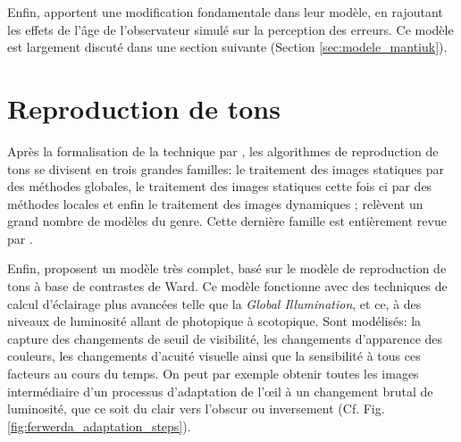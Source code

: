 	\par Enfin, \citep{mantiuk_human_2015} apportent une modification fondamentale dans leur modèle, en rajoutant les effets de l'âge de l'observateur simulé sur la perception des erreurs. Ce modèle est largement discuté dans une section suivante (Section \ref{sec:modele_mantiuk}).
	
	\section{Reproduction de tons}
	\par Après la formalisation de la technique par \citep{rushmeier_comparing_1995}, les algorithmes de reproduction de tons se divisent en trois grandes familles: le traitement des images statiques par des méthodes globales, le traitement des images statiques cette fois ci par des méthodes locales et enfin le traitement des images dynamiques ; \citep{moreau_traite_2006} relèvent un grand nombre de modèles du genre. Cette dernière famille est entièrement revue par \citep{drago_perceptual_2003}.
	
	\par Enfin, \citep{ferwerda_model_1996} proposent un modèle très complet, basé sur le modèle de reproduction de tons à base de contrastes de Ward. Ce modèle fonctionne avec des techniques de calcul d'éclairage plus avancées telle que la \textit{Global Illumination}, et ce, à des niveaux de luminosité allant de photopique à scotopique. Sont modélisés: la capture des changements de seuil de visibilité, les changements d'apparence des couleurs, les changements d'acuité visuelle ainsi que la sensibilité à tous ces facteurs au cours du temps. On peut par exemple obtenir toutes les images intermédiaire d'un processus d'adaptation de l'œil à un changement brutal de luminosité, que ce soit du clair vers l'obscur ou inversement (Cf. Fig. \ref{fig:ferwerda_adaptation_steps}).
	
